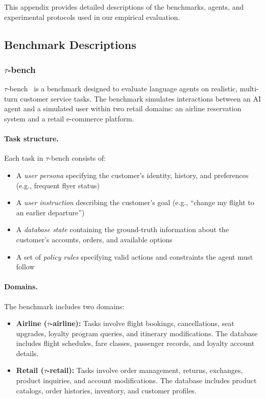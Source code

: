 \documentclass[11pt]{article}
\begin{document}
This appendix provides detailed descriptions of the benchmarks, agents, and experimental protocols used in our empirical evaluation.

\subsection{Benchmark Descriptions}
\label{appendix:benchmarks}

\subsubsection{$\tau$-bench}

$\tau$-bench~\citep{yao2024tau} is a benchmark designed to evaluate language agents on realistic, multi-turn customer service tasks.
The benchmark simulates interactions between an AI agent and a simulated user within two retail domains: an airline reservation system and a retail e-commerce platform.

\paragraph{Task structure.}
Each task in $\tau$-bench consists of:
\begin{itemize}[leftmargin=*, topsep=2pt]
    \item A \emph{user persona} specifying the customer's identity, history, and preferences (e.g., frequent flyer status)
    \item A \emph{user instruction} describing the customer's goal (e.g., ``change my flight to an earlier departure'')
    \item A \emph{database state} containing the ground-truth information about the customer's accounts, orders, and available options
    \item A set of \emph{policy rules} specifying valid actions and constraints the agent must follow
\end{itemize}

\paragraph{Domains.}
The benchmark includes two domains:
\begin{itemize}[leftmargin=*, topsep=2pt]
    \item \textbf{Airline ($\tau$-airline):} Tasks involve flight bookings, cancellations, seat upgrades, loyalty program queries, and itinerary modifications. The database includes flight schedules, fare classes, passenger records, and loyalty account details.
    \item \textbf{Retail ($\tau$-retail):} Tasks involve order management, returns, exchanges, product inquiries, and account modifications. The database includes product catalogs, order histories, inventory, and customer profiles.
\end{itemize}
\end{document}
